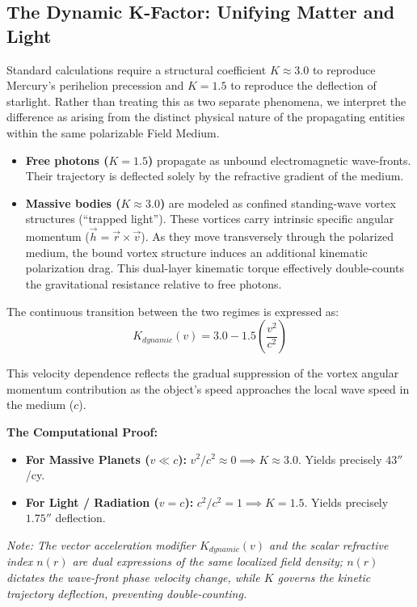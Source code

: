 \documentclass[reprint,amsmath,amssymb,aps,prd,twocolumn]{revtex4-2}
\begin{document}
\subsection{The Dynamic K-Factor: Unifying Matter and Light}

Standard calculations require a structural coefficient $K \approx 3.0$ to reproduce Mercury's perihelion precession and $K = 1.5$ to reproduce the deflection of starlight. Rather than treating this as two separate phenomena, we interpret the difference as arising from the distinct physical nature of the propagating entities within the same polarizable Field Medium.

\begin{itemize}
    \item \textbf{Free photons ($K = 1.5$)} propagate as unbound electromagnetic wave-fronts. Their trajectory is deflected solely by the refractive gradient of the medium.
    \item \textbf{Massive bodies ($K \approx 3.0$)} are modeled as confined standing-wave vortex structures (``trapped light''). These vortices carry intrinsic specific angular momentum ($\vec{h} = \vec{r} \times \vec{v}$). As they move transversely through the polarized medium, the bound vortex structure induces an additional kinematic polarization drag. This dual-layer kinematic torque effectively double-counts the gravitational resistance relative to free photons.
\end{itemize}

The continuous transition between the two regimes is expressed as:
\begin{equation}
K_{dynamic}(v) = 3.0 - 1.5 \left( \frac{v^2}{c^2} \right)
\end{equation}

This velocity dependence reflects the gradual suppression of the vortex angular momentum contribution as the object's speed approaches the local wave speed in the medium ($c$).

\textbf{The Computational Proof:}
\begin{itemize}
    \item \textbf{For Massive Planets ($v \ll c$):} $v^2/c^2 \approx 0 \implies K \approx 3.0$. Yields precisely $43''$/cy.
    \item \textbf{For Light / Radiation ($v = c$):} $c^2/c^2 = 1 \implies K = 1.5$. Yields precisely $1.75''$ deflection.
\end{itemize}

\textit{Note: The vector acceleration modifier $K_{dynamic}(v)$ and the scalar refractive index $n(r)$ are dual expressions of the same localized field density; $n(r)$ dictates the wave-front phase velocity change, while $K$ governs the kinetic trajectory deflection, preventing double-counting.}
\end{document}

